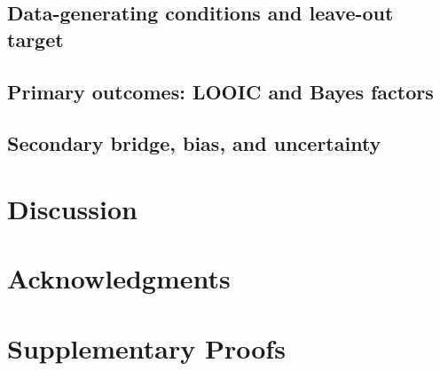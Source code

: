 \documentclass[11pt]{article}
\begin{document}
\subsection{Data-generating conditions and leave-out target}


\subsection{Primary outcomes: LOOIC and Bayes factors}


\subsection{Secondary bridge, bias, and uncertainty}


\section{Discussion}

\section*{Acknowledgments}




\appendix

\section{Supplementary Proofs}


\end{document}
